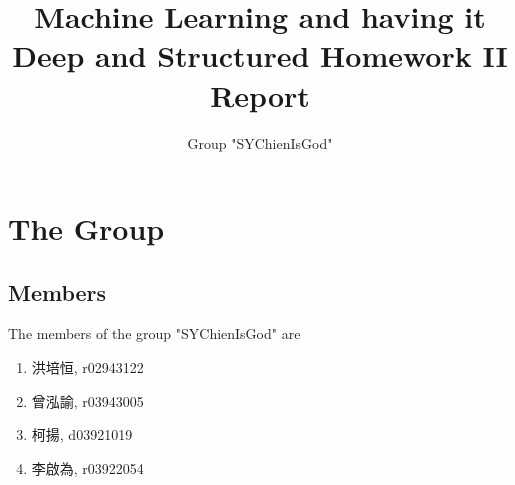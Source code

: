 \documentclass[]{article}
\title{Machine Learning and having it Deep and Structured Homework II Report}
\author{Group "SYChienIsGod"}
\begin{document}
\maketitle


\section{The Group}
\subsection{Members}
The members of the group "SYChienIsGod" are
\begin{CJK}{UTF8}{bsmi}
\begin{enumerate}
	\item 洪培恒, r02943122
	\item 曾泓諭, r03943005
	\item 柯揚, d03921019
	\item 李啟為, r03922054 
\end{enumerate}
\end{CJK}
\end{document}
